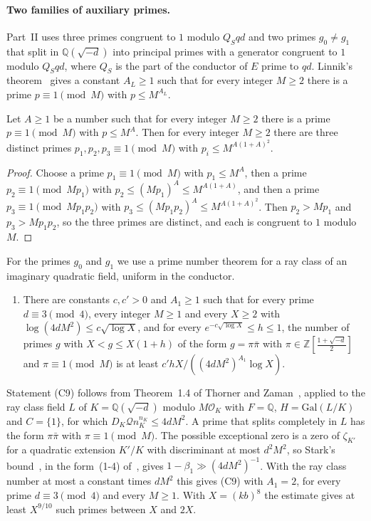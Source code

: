 \paragraph{Two families of auxiliary primes.} Part~II uses three primes congruent to $1$ modulo $Q_Sqd$ and two primes $g_0\ne g_1$ that split in $\mathbb Q(\sqrt{-d})$ into principal primes with a generator congruent to $1$ modulo $Q_Sqd$, where $Q_S$ is the part of the conductor of $E$ prime to $qd$. Linnik's theorem~\cite{linnik} gives a constant $A_L\ge1$ such that for every integer $M\ge2$ there is a prime $p\equiv1\pmod M$ with $p\le M^{A_L}$.

\begin{lemma}\label{three}
Let $A\ge1$ be a number such that for every integer $M\ge2$ there is a prime $p\equiv1\pmod M$ with $p\le M^A$. Then for every integer $M\ge2$ there are three distinct primes $p_1,p_2,p_3\equiv1\pmod M$ with $p_i\le M^{A(1+A)^2}$.
\end{lemma}

\begin{proof}
Choose a prime $p_1\equiv1\pmod M$ with $p_1\le M^A$, then a prime $p_2\equiv1\pmod{Mp_1}$ with $p_2\le(Mp_1)^A\le M^{A(1+A)}$, and then a prime $p_3\equiv1\pmod{Mp_1p_2}$ with $p_3\le(Mp_1p_2)^A\le M^{A(1+A)^2}$. Then $p_2>Mp_1$ and $p_3>Mp_1p_2$, so the three primes are distinct, and each is congruent to $1$ modulo $M$.
\end{proof}

For the primes $g_0$ and $g_1$ we use a prime number theorem for a ray class of an imaginary quadratic field, uniform in the conductor.
\begin{enumerate}
\item[(C9)] There are constants $c,c'>0$ and $A_1\ge1$ such that for every prime $d\equiv3\pmod4$, every integer $M\ge1$ and every $X\ge2$ with $\log(4dM^2)\le c\sqrt{\log X}$, and for every $e^{-c\sqrt{\log X}}\le h\le1$, the number of primes $g$ with $X<g\le X(1+h)$ of the form $g=\pi\bar\pi$ with $\pi\in\mathbb Z[\frac{1+\sqrt{-d}}2]$ and $\pi\equiv1\pmod M$ is at least $c'hX/((4dM^2)^{A_1}\log X)$.
\end{enumerate}
Statement (C9) follows from Theorem~1.4 of Thorner and Zaman~\cite{thornerzaman19}, applied to the ray class field $L$ of $K=\mathbb Q(\sqrt{-d})$ modulo $M\mathcal O_K$ with $F=\mathbb Q$, $H=\mathrm{Gal}(L/K)$ and $C=\{1\}$, for which $D_K\mathcal Q n_K^{n_K}\le4dM^2$. A prime that splits completely in $L$ has the form $\pi\bar\pi$ with $\pi\equiv1\pmod M$. The possible exceptional zero is a zero of $\zeta_{K'}$ for a quadratic extension $K'/K$ with discriminant at most $d^2M^2$, so Stark's bound~\cite[Theorem~1$'$]{stark74}, in the form~(1-4) of~\cite{thornerzaman19}, gives $1-\beta_1\gg(4dM^2)^{-1}$. With the ray class number at most a constant times $dM^2$ this gives (C9) with $A_1=2$, for every prime $d\equiv3\pmod4$ and every $M\ge1$. With $X=(kb)^8$ the estimate gives at least $X^{9/10}$ such primes between $X$ and $2X$.

